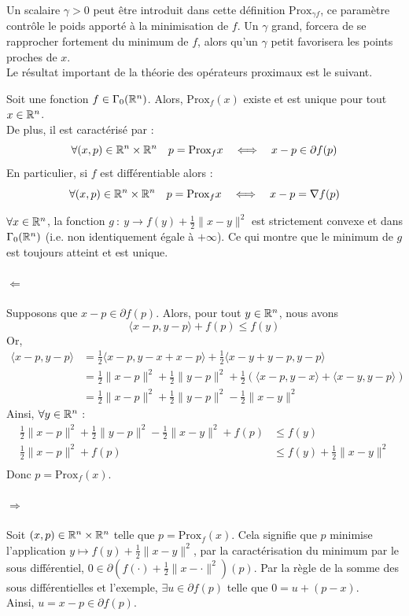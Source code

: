 \documentclass[a4paper,12pt]{article}
\newcommand{\prox}{\text{Prox}}
\begin{document}
\newpage
Un scalaire $\gamma >0 $ peut être introduit dans cette définition $\prox_{\gamma f}$, ce paramètre contrôle le poids apporté à la minimisation de $f$. Un $\gamma$ grand, forcera de se rapprocher fortement du minimum de $f$, alors qu'un $\gamma$ petit favorisera les points proches de $x$.\\
Le résultat important de la théorie des opérateurs proximaux est le suivant. 
\begin{propriete}
Soit une fonction $f\in\Gamma_0(\mathbb{R}^n)$. Alors, $\prox_f(x)$ existe et est unique pour tout $x\in\mathbb{R}^n$.\\
De plus, il est caractérisé par : 
$$
\forall (x,p)\in \RR^n\times\RR^n\quad p=\prox_fx\quad\Longleftrightarrow\quad x-p\in\partial f(p)
$$
En particulier, si $f$ est différentiable alors : 
$$
\forall (x,p)\in \RR^n\times\RR^n\quad p=\prox_fx\quad \Longleftrightarrow \quad x-p=\nabla f(p)
$$
\end{propriete}
\begin{preuve}
$\forall x \in \mathbb{R}^n$, la fonction $g\ :\ y \rightarrow f(y) +\frac{1}{2}\|x-y\|^2$ est strictement convexe et dans $\Gamma_0(\mathbb{R}^n)$ (i.e. non identiquement égale à $+\infty$). Ce qui montre que le minimum de $g$ est toujours atteint et est unique. 


\paragraph{$\Leftarrow$} Supposons que $x-p\in\partial f(p)$. Alors, pour tout $y\in\mathbb{R}^n$, nous avons 
$$
\langle x-p,y-p\rangle +f(p) \leq f(y)
$$
Or,
\begin{align*}
\langle x-p,y-p\rangle &= \frac{1}{2}\langle x-p,y-x+x-p\rangle + \frac{1}{2}\langle  x-y+y-p,y-p\rangle\\
&=\frac{1}{2} \|x-p\|^2 + \frac{1}{2}\|y-p \|^2 +\frac{1}{2}\left( \langle x-p,y-x\rangle + \langle x-y,y-p\rangle\right)\\
&= \frac{1}{2} \|x-p\|^2 + \frac{1}{2}\|y-p \|^2 -\frac{1}{2}\|x-y\|^2
\end{align*}
Ainsi, $\forall y\in\mathbb{R}^n$ :
\begin{align*}
\frac{1}{2} \|x-p\|^2 + \frac{1}{2}\|y-p \|^2 -\frac{1}{2}\|x-y\|^2 + f(p) &\leq f(y) \\
\frac{1}{2} \|x-p\|^2 + f(p) &\leq f(y) + \frac{1}{2}\|x-y\|^2\\
\end{align*}
Donc $p=\prox_f(x)$.
\paragraph{$\Rightarrow$} Soit $(x,p)\in \mathbb{R}^n\times\mathbb{R}^n$ telle que $p=\prox_f(x)$. Cela signifie que $p$ minimise l'application $y\mapsto f(y)+\frac{1}{2}\|x-y\|^2$, par la caractérisation du minimum par le sous différentiel, $0\in\partial \left(f(\cdot)+\frac{1}{2}\|x-\cdot\|^2 \right)(p)$. Par la règle de la somme des sous différentielles et l'exemple, $\exists u\in\partial f(p)$ telle que $0=u+(p-x)$. \\
Ainsi, $u=x-p\in\partial f(p)$. 
\end{preuve}
 
\end{document}
